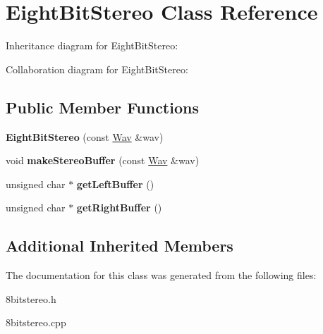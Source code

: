 \hypertarget{classEightBitStereo}{}\section{Eight\+Bit\+Stereo Class Reference}
\label{classEightBitStereo}


Inheritance diagram for Eight\+Bit\+Stereo\+:


Collaboration diagram for Eight\+Bit\+Stereo\+:
\subsection*{Public Member Functions}
\begin{DoxyCompactItemize}
\item 
\mbox{\label{classEightBitStereo_a41153c5acf30d3805d7753bcd885ff53}} 
{\bfseries Eight\+Bit\+Stereo} (const \hyperlink{classWav}{Wav} \&wav)
\item 
\mbox{\label{classEightBitStereo_a1026484b3f96f2cee5177fa4157b94c8}} 
void {\bfseries make\+Stereo\+Buffer} (const \hyperlink{classWav}{Wav} \&wav)
\item 
\mbox{\label{classEightBitStereo_a02f9e38138558a3961a0e9ebae8777f8}} 
unsigned char $\ast$ {\bfseries get\+Left\+Buffer} ()
\item 
\mbox{\label{classEightBitStereo_a261d17d0eea610c8929c5c2a814da8f5}} 
unsigned char $\ast$ {\bfseries get\+Right\+Buffer} ()
\end{DoxyCompactItemize}
\subsection*{Additional Inherited Members}


The documentation for this class was generated from the following files\+:\begin{DoxyCompactItemize}
\item 
8bitstereo.\+h\item 
8bitstereo.\+cpp\end{DoxyCompactItemize}
